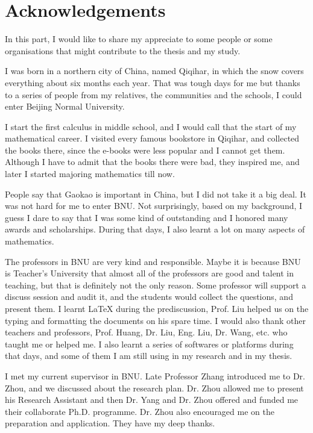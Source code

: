 \chapter*{Acknowledgements}

\bigskip


In this part, I would like to share my appreciate to 
some people or some organisations that might contribute 
to the thesis and my study. 

I was born in a northern city of China, named Qiqihar, 
in which the snow covers everything about six months 
each year. That was tough days for me but thanks to 
a series of people from my relatives, the communities 
and the schools, I could enter Beijing Normal University. 

I start the first calculus in middle school, and 
I would call that the start of my mathematical career. 
I visited every famous bookstore in Qiqihar, and collected 
the books there, since the e-books were less popular and 
I cannot get them. 
Although I have to admit that the books there were bad, 
they inspired me, and later I started majoring mathematics 
till now. 

People say that Gaokao is important in China, but I did not 
take it a big deal. It was not hard for me to enter BNU. 
Not surprisingly, based on my background, I guess I dare to 
say that I was some kind of outstanding and I honored many 
awards and scholarships. During that days, I also learnt 
a lot on many aspects of mathematics. 

The professors in BNU are very kind and responsible. 
Maybe it is because BNU is Teacher's University that 
almost all of the professors are good and talent in 
teaching, but that is definitely not the only reason. 
Some professor will support a discuss session and audit it, 
and the students would collect the questions, and present 
them. I learnt LaTeX during the prediscussion, Prof. Liu 
helped us on the typing and formatting the documents 
on his spare time. I would also thank other teachers and 
professors, Prof. Huang, Dr. Liu, Eng. Liu, Dr. Wang, etc. 
who taught me or helped me. 
I also learnt a series of softwares or platforms 
during that days, and some of them I am still using 
in my research and in my thesis. 

I met my current supervisor in BNU. Late Professor Zhang 
introduced me to Dr. Zhou, and we discussed about the research plan. Dr. Zhou allowed me to present his Research Assistant and then Dr. Yang and Dr. Zhou offered and funded me their collaborate Ph.D. programme. 
Dr. Zhou also encouraged me on the preparation and application. They have my deep thanks. 

